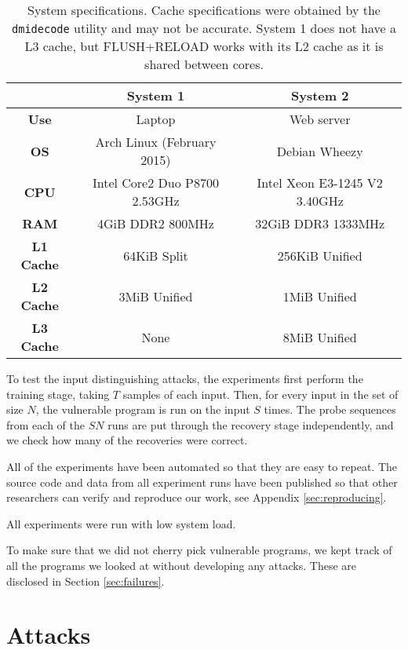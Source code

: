 \documentclass[letterpaper,twocolumn,10pt]{article}
\begin{document}
\begin{table*}
    \centering
\begin{tabular}{|c|c|c|}
    \hline
    & \textbf{System 1} & \textbf{System 2} \\
    \hline
    \textbf{Use} & Laptop & Web server \\
    \hline
    \textbf{OS} & Arch Linux (February 2015) & Debian Wheezy \\
    \hline
    \textbf{CPU} & Intel Core2 Duo P8700 2.53GHz & Intel Xeon E3-1245 V2 3.40GHz  \\
    \hline
    \textbf{RAM} & 4GiB DDR2 800MHz & 32GiB DDR3 1333MHz \\
    \hline
    \textbf{L1 Cache} & 64KiB Split & 256KiB Unified \\
    \hline
    \textbf{L2 Cache} & 3MiB Unified & 1MiB Unified \\
    \hline
    \textbf{L3 Cache} & None & 8MiB Unified \\
    \hline
\end{tabular}
\caption{System specifications. Cache specifications were obtained by the
\texttt{dmidecode} utility and may not be accurate. System 1 does not have a L3
cache, but FLUSH+RELOAD works with its L2 cache as it is shared between cores.}
\label{table:specs}
\end{table*}

To test the input distinguishing attacks, the experiments first perform the
training stage, taking $T$ samples of each input. Then, for every input in the
set of size $N$, the vulnerable program is run on the input $S$ times. The probe
sequences from each of the $SN$ runs are put through the recovery stage
independently, and we check how many of the recoveries were correct.

All of the experiments have been automated so that they are easy to repeat. The
source code and data from all experiment runs have been published so that other
researchers can verify and reproduce our work, see Appendix
\ref{sec:reproducing}.

All experiments were run with low system load.

To make sure that we did not cherry pick vulnerable programs, we kept track of
all the programs we looked at without developing any attacks. These are
disclosed in Section \ref{sec:failures}.

\section{Attacks}
\label{sec:results}
\end{document}
